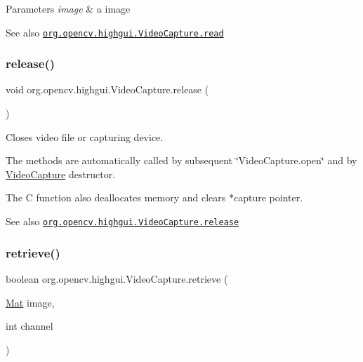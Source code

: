 \begin{DoxyParams}{Parameters}
{\em image} & a image\\
\hline
\end{DoxyParams}
\begin{DoxySeeAlso}{See also}
\href{http://docs.opencv.org/modules/highgui/doc/reading_and_writing_images_and_video.html#videocapture-read}{\tt org.\+opencv.\+highgui.\+Video\+Capture.\+read} 
\end{DoxySeeAlso}
\mbox{\label{classorg_1_1opencv_1_1highgui_1_1_video_capture_a605d177774ab4ad8b92270a9d7682262}} 
\subsubsection{\texorpdfstring{release()}{release()}}
{\footnotesize\ttfamily void org.\+opencv.\+highgui.\+Video\+Capture.\+release (\begin{DoxyParamCaption}{ }\end{DoxyParamCaption})}

Closes video file or capturing device.

The methods are automatically called by subsequent \char`\"{}\+Video\+Capture.\+open\char`\"{} and by {\ttfamily \mbox{\hyperlink{classorg_1_1opencv_1_1highgui_1_1_video_capture}{Video\+Capture}}} destructor.

The C function also deallocates memory and clears {\ttfamily $\ast$capture} pointer.

\begin{DoxySeeAlso}{See also}
\href{http://docs.opencv.org/modules/highgui/doc/reading_and_writing_images_and_video.html#videocapture-release}{\tt org.\+opencv.\+highgui.\+Video\+Capture.\+release} 
\end{DoxySeeAlso}
\mbox{\label{classorg_1_1opencv_1_1highgui_1_1_video_capture_a222457b750c7be22da0f867e4759c631}} 
\subsubsection{\texorpdfstring{retrieve()}{retrieve()}\hspace{0.1cm}{\footnotesize\ttfamily [1/2]}}
{\footnotesize\ttfamily boolean org.\+opencv.\+highgui.\+Video\+Capture.\+retrieve (\begin{DoxyParamCaption}\item[{\mbox{\hyperlink{classorg_1_1opencv_1_1core_1_1_mat}{Mat}}}]{image,  }\item[{int}]{channel }\end{DoxyParamCaption})}

